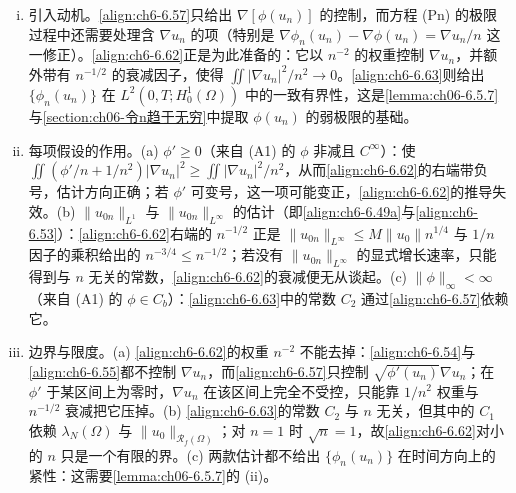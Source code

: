 \documentclass[../../main.tex]{subfiles}%
\begin{document}
\begin{remark}\label{remark:ch06-6.5.5动机}
\begin{enumerate}[(i)]
\item 引入动机。\eqref{align:ch6-6.57}只给出 $\nabla[\phi(u_n)]$ 的控制，而方程 (Pn) 的极限过程中还需要处理含 $\nabla u_n$ 的项（特别是 $\nabla\phi_n(u_n)-\nabla\phi(u_n)=\nabla u_n/n$ 这一修正）。\eqref{align:ch6-6.62}正是为此准备的：它以 $n^{-2}$ 的权重控制 $\nabla u_n$，并额外带有 $n^{-1/2}$ 的衰减因子，使得 $\iint|\nabla u_n|^2/n^2\to0$。\eqref{align:ch6-6.63}则给出 $\{\phi_n(u_n)\}$ 在 $L^2(0,T;H^1_0(\Omega))$ 中的一致有界性，这是\cref{lemma:ch06-6.5.7}与\cref{section:ch06-令n趋于无穷}中提取 $\phi(u_n)$ 的弱极限的基础。
\item 每项假设的作用。(a) $\phi'\geqslant0$（来自 (A1) 的 $\phi$ 非减且 $C^\infty$）：使 $\iint(\phi'/n+1/n^2)|\nabla u_n|^2\geqslant\iint|\nabla u_n|^2/n^2$，从而\eqref{align:ch6-6.62}的右端带负号，估计方向正确；若 $\phi'$ 可变号，这一项可能变正，\eqref{align:ch6-6.62}的推导失效。(b) $\|u_{0n}\|_{L^1}$ 与 $\|u_{0n}\|_{L^\infty}$ 的估计（即\eqref{align:ch6-6.49a}与\eqref{align:ch6-6.53}）：\eqref{align:ch6-6.62}右端的 $n^{-1/2}$ 正是 $\|u_{0n}\|_{L^\infty}\leqslant M\|u_0\|n^{1/4}$ 与 $1/n$ 因子的乘积给出的 $n^{-3/4}\leqslant n^{-1/2}$；若没有 $\|u_{0n}\|_{L^\infty}$ 的显式增长速率，只能得到与 $n$ 无关的常数，\eqref{align:ch6-6.62}的衰减便无从谈起。(c) $\|\phi\|_\infty<\infty$（来自 (A1) 的 $\phi\in C_b$）：\eqref{align:ch6-6.63}中的常数 $C_2$ 通过\eqref{align:ch6-6.57}依赖它。
\item 边界与限度。(a) \eqref{align:ch6-6.62}的权重 $n^{-2}$ 不能去掉：\eqref{align:ch6-6.54}与\eqref{align:ch6-6.55}都不控制 $\nabla u_n$，而\eqref{align:ch6-6.57}只控制 $\sqrt{\phi'(u_n)}\nabla u_n$；在 $\phi'$ 于某区间上为零时，$\nabla u_n$ 在该区间上完全不受控，只能靠 $1/n^2$ 权重与 $n^{-1/2}$ 衰减把它压掉。(b) \eqref{align:ch6-6.63}的常数 $C_2$ 与 $n$ 无关，但其中的 $C_1$ 依赖 $\lambda_N(\Omega)$ 与 $\|u_0\|_{\mathscr{R}_f(\Omega)}$；对 $n=1$ 时 $\sqrt{n}=1$，故\eqref{align:ch6-6.62}对小的 $n$ 只是一个有限的界。(c) 两款估计都不给出 $\{\phi_n(u_n)\}$ 在时间方向上的紧性：这需要\cref{lemma:ch06-6.5.7}的 (ii)。
\end{enumerate}
\end{remark}
\end{document}
